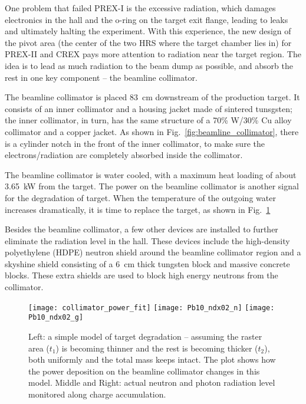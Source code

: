 One problem that failed PREX-I is the excessive radiation, which damages
electronics in the hall and the o-ring on the target exit flange, leading to
leaks and ultimately halting the experiment.
With this experience, the new design of the pivot area (the center of the two HRS 
where the target chamber lies in) for PREX-II and CREX pays more attention
to radiation near the target region. The idea is to lead as much radiation to
the beam dump as possible, and absorb the rest in one key component --
the beamline collimator. 

The beamline collimator is placed 83~cm downstream of the production 
target. It consists of an inner collimator and a housing
jacket made of sintered tunsgsten; the inner collimator, in turn, has the same 
structure of a 70\% W/30\% Cu alloy collimator and a copper jacket. As shown
in Fig.~\ref{fig:beamline_collimator}, there is a cylinder notch in the front of
the inner collimator, to make sure the electrons/radiation are completely 
absorbed inside the collimator. 

The beamline collimator is water cooled, with a maximum heat loading of about 
3.65~kW from the \Pb target. The power on the beamline
collimator is another signal for the degradation of target. When the temperature 
of the outgoing water increases dramatically, it is time to replace the \Pb target,
as shown in Fig.~\ref{fig:collimator_see_target_degradation}

Besides the beamline collimator, a few other devices are installed 
to further eliminate the radiation level in the hall. These devices include the 
high-density polyethylene (HDPE) neutron shield around the beamline collimator
region and a skyshine shield consisting of a 6~cm thick tungsten block and
massive concrete blocks. These extra shields are used to block high energy
neutrons from the collimator.

\begin{figure}[!h]
    \texttt{[image: collimator\_power\_fit]}
    \texttt{[image: Pb10\_ndx02\_n]}
    \texttt{[image: Pb10\_ndx02\_g]}
    \caption[Target degradation]
    {Left: a simple model of target degradation -- assuming the raster 
    area ($t_1$) is becoming thinner and the rest is becoming thicker ($t_2$),
    both uniformly and the total mass keeps intact. The plot shows how the power 
    deposition on the beamline collimator changes in this model. Middle and Right: actual
    neutron and photon radiation level monitored along charge accumulation.
    }
    \label{fig:collimator_see_target_degradation}
\end{figure}

